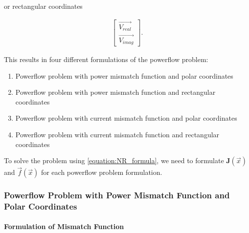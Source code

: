 \noindent or rectangular coordinates

\begin{align*}
	\left [ \begin{array}{c} \vec{V_{real}} \\ \vec{V_{imag}}  \end{array} \right ].
\end{align*}

\noindent This results in four different formulations of the powerflow problem:

\begin{enumerate}
	\item Powerflow problem with power mismatch function and polar coordinates
	\item Powerflow problem with power mismatch function and rectangular coordinates
	\item Powerflow problem with current mismatch function and polar coordinates
	\item Powerflow problem with current mismatch function and rectangular coordinates  
\end{enumerate}

\noindent To solve the problem using \ref{equation:NR_formula}, we need to formulate $\textbf{J} (\vec{x})$ and $\vec{f} (\vec{x})$ for each powerflow problem formulation.

\subsubsection{Powerflow Problem with Power Mismatch Function and Polar Coordinates}
\paragraph{Formulation of Mismatch Function}\mbox{}\\

